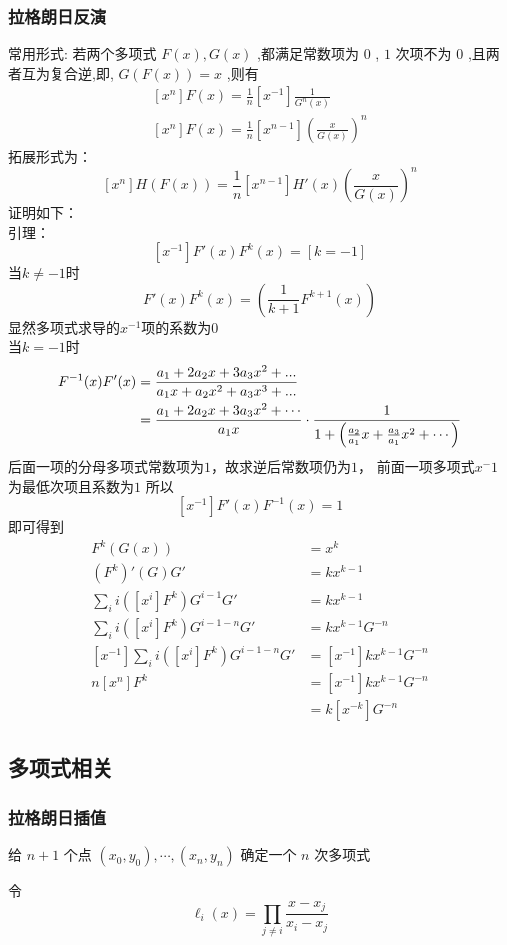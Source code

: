\documentclass{ctexart}
\begin{document}
\subsubsection{拉格朗日反演}
常用形式:
若两个多项式 $F(x),G(x)$ ,都满足常数项为 $0$ , $1$ 次项不为 $0$ ,且两者互为复合逆,即, $G(F(x))=x$ ,则有
$$
\begin{aligned}
[x^n] F(x)=\frac 1 n [x^{-1}] \frac{1}{G^n(x)}\\
[x^n] F(x)=\frac 1 n [x^{n-1}] (\frac{x}{G(x)})^n
\end{aligned}
$$
拓展形式为：
$$
[x^n]H(F(x))=\frac 1 n[x^{n-1}]H'(x)(\frac x {G(x)})^n
$$
证明如下：\\
引理：
$$
[x^{-1}]F'(x)F^k(x)=[k=-1]
$$
当$k\not=-1$时
$$
F'(x)F^k(x)=(\frac{1}{k+1}F^{k+1}(x))
$$
显然多项式求导的$x^{-1}$项的系数为$0$\\
当$k=-1$时
$$
\begin{aligned}
    F^{-1}(x)F'(x)
    &={a_1+2a_2x+3a_3x^2+...\over a_1x+a_2x^2+a_3x^3+...}\\
    &=\frac{a_1+2a_2x+3a_3x^2+\cdots}{a_1x}\cdot \frac{1}{1+\left(\frac{a_2}{a_1}x+\frac{a_3}{a_1}x^2+\cdots\right)}\\
\end{aligned}
$$
后面一项的分母多项式常数项为$1$，故求逆后常数项仍为$1$，
前面一项多项式$x^-1$为最低次项且系数为$1$
所以
$$
[x^{-1}]F'(x)F^{-1}(x)=1
$$
即可得到
$$
\begin{aligned}
    F^k(G(x)) &= x^k \\
    (F^k)'(G)G' &= kx^{k-1} \\
    \sum\limits_i i([x^i] F^k)G^{i-1}G' &= kx^{k-1} \\
    \sum\limits_i i([x^i] F^k)G^{i-1-n}G' &= kx^{k-1} G^{-n} \\
    [x^{-1}]\sum\limits_i i([x^i] F^k)G^{i-1-n}G' &= [x^{-1}]kx^{k-1} G^{-n} \\
    n[x^n] F^k &= [x^{-1}] kx^{k-1}G^{-n} \\
    &= k[x^{-k}] G^{-n}
\end{aligned}
$$
\subsection{多项式相关}
\subsubsection{拉格朗日插值}
给 $n + 1$ 个点 $(x_0, y_0),\cdots,(x_n, y_n)$ 确定一个 $n$ 次多项式

令 
$$
\ell_i(x) = \prod_{j\not = i} \frac{x - x_j}{x_i - x_j}
$$
\end{document}
